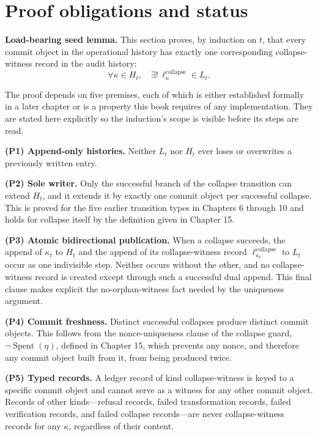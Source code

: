 \documentclass[11pt,openany]{book}
\begin{document}
\section{Proof obligations and status}
\textbf{Load-bearing seed lemma.} This section proves, by induction on \(t\),
that every commit object in the operational history has exactly one
corresponding collapse-witness record in the audit history:
\[
 \forall\kappa\in H_t,\quad
 \exists!\,\ell^{\mathrm{collapse}}_\kappa\in L_t.
\]

The proof depends on five premises, each of which is either established
formally in a later chapter or is a property this book requires of any
implementation. They are stated here explicitly so the induction's scope is
visible before its steps are read.

\textbf{(P1) Append-only histories.} Neither \(L_t\) nor \(H_t\) ever loses or
overwrites a previously written entry.

\textbf{(P2) Sole writer.} Only the successful branch of the collapse
transition can extend \(H_t\), and it extends it by exactly one commit object
per successful collapse. This is proved for the five earlier transition types
in Chapters 6 through 10 and holds for collapse itself by the definition given
in Chapter 15.

\textbf{(P3) Atomic bidirectional publication.} When a collapse succeeds, the
append of \(\kappa_t\) to \(H_t\) and the append of its collapse-witness record
\(\ell^{\mathrm{collapse}}_{\kappa_t}\) to \(L_t\) occur as one indivisible
step. Neither occurs without the other, and no collapse-witness record is
created except through such a successful dual append. This final clause makes
explicit the no-orphan-witness fact needed by the uniqueness argument.

\textbf{(P4) Commit freshness.} Distinct successful collapses produce distinct
commit objects. This follows from the nonce-uniqueness clause of the collapse
guard, \(\neg\operatorname{Spent}(\eta)\), defined in Chapter 15, which
prevents any nonce, and therefore any commit object built from it, from being
produced twice.

\textbf{(P5) Typed records.} A ledger record of kind collapse-witness is keyed
to a specific commit object and cannot serve as a witness for any other commit
object. Records of other kinds---refusal records, failed transformation
records, failed verification records, and failed collapse records---are never
collapse-witness records for any \(\kappa\), regardless of their content.
\end{document}
